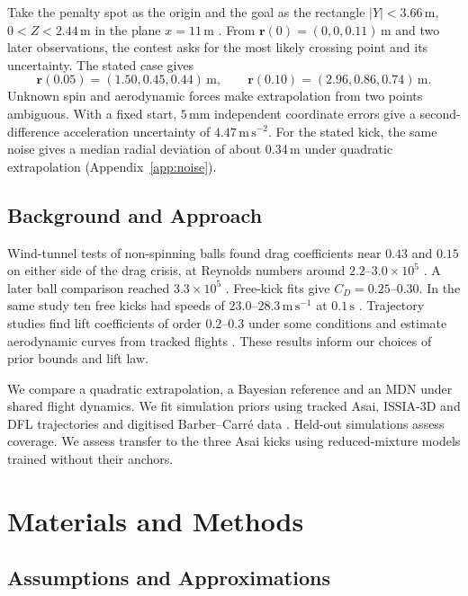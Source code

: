 \documentclass[11pt,a4paper]{article}
\begin{document}
Take the penalty spot as the origin and the goal as the rectangle $|Y|<3.66\,\mathrm{m}$, $0<Z<2.44\,\mathrm{m}$ in the plane $x=11\,\mathrm{m}$ \cite{ifab}. From $\mathbf r(0)=(0,0,0.11)\,\mathrm{m}$ and two later observations, the contest asks for the most likely crossing point and its uncertainty. The stated case gives \cite{upc2026}
\begin{equation}
  \mathbf r(0.05)=(1.50,0.45,0.44)\,\mathrm{m},\qquad
  \mathbf r(0.10)=(2.96,0.86,0.74)\,\mathrm{m}.
  \label{eq:given}
\end{equation}
Unknown spin and aerodynamic forces make extrapolation from two points ambiguous. With a fixed start, $5\,\mathrm{mm}$ independent coordinate errors give a second-difference acceleration uncertainty of $4.47\,\mathrm{m\,s^{-2}}$. For the stated kick, the same noise gives a median radial deviation of about $0.34\,\mathrm{m}$ under quadratic extrapolation (Appendix~\ref{app:noise}).

\subsection{Background and Approach}

Wind-tunnel tests of non-spinning balls found drag coefficients near $0.43$ and $0.15$ on either side of the drag crisis, at Reynolds numbers around $2.2$--$3.0\times10^5$ \cite{asai2007}. A later ball comparison reached $3.3\times10^5$ \cite{asai2013}. Free-kick fits give $C_D=0.25$--$0.30$. In the same study ten free kicks had speeds of $23.0$--$28.3\,\mathrm{m\,s^{-1}}$ at $0.1\,\mathrm{s}$ \cite{bray2003}. Trajectory studies find lift coefficients of order $0.2$--$0.3$ under some conditions and estimate aerodynamic curves from tracked flights \cite{goff2010,goff2017}. These results inform our choices of prior bounds and lift law.

We compare a quadratic extrapolation, a Bayesian reference and an MDN \cite{bishop1994} under shared flight dynamics. We fit simulation priors using tracked Asai, ISSIA-3D and DFL trajectories and digitised Barber--Carr\'e data \cite{asai2020,soccernetv3d,issia,dfl2025,barber2010}. Held-out simulations assess coverage. We assess transfer to the three Asai kicks using reduced-mixture models trained without their anchors.

\section{Materials and Methods}
\subsection{Assumptions and Approximations}
\end{document}
